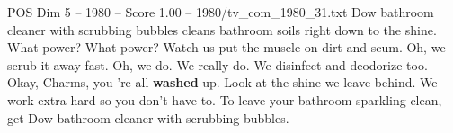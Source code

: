 \begin{textsample}{POS Dim 5 – 1980 – Score 1.00 – 1980/tv\_com\_1980\_31.txt}  \label{ex:f5_pos_018}
Dow bathroom cleaner with scrubbing bubbles cleans bathroom soils right down to the shine.
What power?
What power?
Watch us put the muscle on dirt and scum.
Oh, we scrub it away fast.
Oh, we do.
We really do.
We disinfect and deodorize too.
Okay, Charms, you 're all \textbf{washed} up.
Look at the shine we leave behind.
We work extra hard so you don't have to.
To leave your bathroom sparkling clean, get Dow bathroom cleaner with scrubbing bubbles.

\end{textsample}
